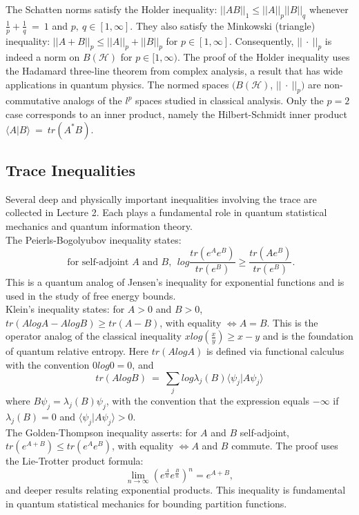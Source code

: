 \documentclass[11pt,a4paper]{article}
\begin{document}
The Schatten norms satisfy the Holder inequality: $||AB||_1 \leq ||A||_p ||B||_q$ whenever $\frac{1}{p} + \frac{1}{q}\ =\ 1$ and $p,\ q \in [1, \infty]$. They also satisfy the Minkowski (triangle) inequality: $||A + B||_p \leq ||A||_p + ||B||_p$ for $p \in [1, \infty]$. Consequently, $||\ \cdot\ ||_p$ is indeed a norm on $B(\mathcal{H})$ for $p \in [1, \infty)$. The proof of the Holder inequality uses the Hadamard three-line theorem from complex analysis, a result that has wide applications in quantum physics. The normed spaces $(B(\mathcal{H})$, $||\ \cdot\ ||_p)$ are non-commutative analogs of the $l^p$ spaces studied in classical analysis. Only the $p = 2$ case corresponds to an inner product, namely the Hilbert-Schmidt inner product $\langle A|B \rangle\ =\ tr(A^*B)$.

\subsection{Trace Inequalities}
Several deep and physically important inequalities involving the trace are collected in Lecture 2. Each plays a fundamental role in quantum statistical mechanics and quantum information theory. \\

The Peierls-Bogolyubov inequality states: $$\text{ for self-adjoint } A \text{ and } B,\ \ log\frac{tr(e^A e^B)}{tr(e^B)} \geq \frac{tr(A e^B)}{tr(e^B)}.$$ This is a quantum analog of Jensen's inequality for exponential functions and is used in the study of free energy bounds. \\

Klein's inequality states: for $A > 0$ and $B > 0$, $tr(A log A - A log B) \geq tr(A - B)$, with equality $\Leftrightarrow A = B$. This is the operator analog of the classical inequality $x log(\frac{x}{y}) \geq x - y$ and is the foundation of quantum relative entropy. Here $tr(A log A)$ is defined via functional calculus with the convention $0 log 0 = 0$, and $$tr(A log B)\ =\ \sum_j log\lambda_j(B) \langle \psi_j|A \psi_j \rangle$$ where $B \psi_j = \lambda_j(B) \psi_j$, with the convention that the expression equals $-\infty$ if $\lambda_j(B) = 0$ and $\langle \psi_j|A \psi_j \rangle > 0$. \\

The Golden-Thompson inequality asserts: for $A$ and $B$ self-adjoint, $tr(e^{A+B}) \leq tr(e^A e^B)$, with equality $\Leftrightarrow A$ and $B$ commute. The proof uses the Lie-Trotter product formula: $$\lim_{n\rightarrow \infty} (e^{\frac{A}{n}} e^{\frac{B}{n}})^n = e^{A+B},$$ and deeper results relating exponential products. This inequality is fundamental in quantum statistical mechanics for bounding partition functions. \\
\end{document}
